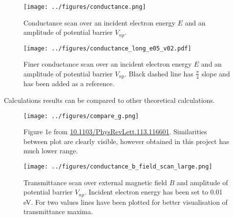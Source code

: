 \documentclass{beamer}
\begin{document}
\begin{frame}
    \begin{figure}
        \begin{center}
            \texttt{[image: ../figures/conductance.png]}
        \end{center}
        \caption{Conductance scan over an incident electron energy $E$ and an amplitude of potential barrier $V_{np}$.}
    \end{figure}
\end{frame}

\begin{frame}
    \begin{figure}
        \begin{center}
            \texttt{[image: ../figures/conductance\_long\_e05\_v02.pdf]}
        \end{center}
        \caption{Finer conductance scan over an incident electron energy $E$ and an amplitude of potential barrier $V_{np}$. Black dashed line has $\frac{\pi}{4}$ slope and has been added as a reference.}
    \end{figure}
\end{frame}

\begin{frame}
    Calculations results can be compared to other theoretical calculations.
    \begin{figure}
        \begin{center}
            \texttt{[image: ../figures/compare\_g.png]}
        \end{center}
        \caption{Figure 1e from \url{10.1103/PhysRevLett.113.116601}. Similarities between plot are clearly visible, however obtained in this project has much lower range.}
    \end{figure}
\end{frame}

\begin{frame}
    \begin{figure}
        \begin{center}
            \texttt{[image: ../figures/conductance\_b\_field\_scan\_large.png]}
        \end{center}
        \caption{Transmittance scan over external magnetic field $B$ and amplitude of potential barrier $V_{np}$. Incident electron energy has been set to 0.01 eV. For two values lines have been plotted for better visualisation of transmittance maxima.}
    \end{figure}
\end{frame}
\end{document}
